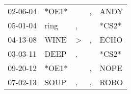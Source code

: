 \begin{supertabular}{lllll}
 02-06-04 &  *OE1* &               &  , &   ANDY \\
 05-01-04 &   ring &             , &    &  *CS2* \\
 04-13-08 &   WINE &  \textgreater &  , &   ECHO \\
 03-03-11 &   DEEP &             , &    &  *CS2* \\
 09-20-12 &  *OE1* &               &  , &   NOPE \\
 07-02-13 &   SOUP &             , &  , &   ROBO \\
\end{supertabular}
